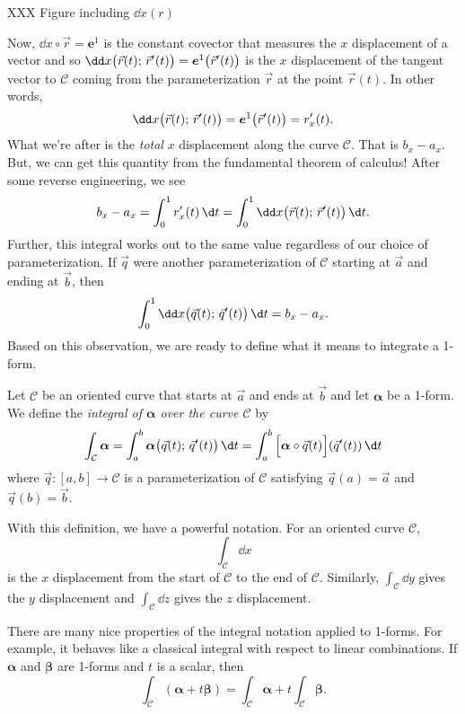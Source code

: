 XXX Figure including $\dd x(r)$

Now, $\dd x\circ \vec r = \bm e^1$ is the constant covector that measures
the $x$ displacement of a vector and so $\dd x \formarg{\vec r(t)}{\vec r'(t)}
=\bm e^1\big(\vec r'(t)\big)$
is the $x$ displacement of the tangent vector to $\mathcal C$ coming
from the parameterization $\vec r$ at the point $\vec r(t)$.   In other words,
\[
	\dd x\formarg{\vec r(t)}{\vec r'(t)}=\bm e^1\big(\vec r'(t)\big) = r_x'(t).
\]
What we're after is the \emph{total} $x$ displacement along the curve $\mathcal C$.
That is $b_x-a_x$.  But, we can get this quantity from the fundamental theorem
of calculus!  After some reverse engineering, we see
\[
	b_x-a_x = \int_0^1 r_x'(t)\, \d t 
	= \int_0^1 \dd x\formarg{\vec r(t)}{\vec r'(t)}\,\d t.
\]
Further, this integral works out to the same value regardless of our
choice of parameterization.  If $\vec q$ were another parameterization 
of $\mathcal C$ starting
at $\vec a$ and ending at $\vec b$, then 
\[
\int_0^1 \dd x\formarg{\vec q(t)}{\vec q'(t)}\,\d t=b_x-a_x.
\]
Based on this observation,
we are ready to define what it means to integrate a 1-form.

\begin{definition}
	Let $\mathcal C$ be an oriented curve that starts at $\vec a$
	and ends at $\vec b$ and let $\bm \alpha$ be a 1-form.  We define
	the \emph{integral of $\bm \alpha$ over the curve $\mathcal C$}
	by
	\[
		\int_{\mathcal C}\bm\alpha 
		=\int_a^b \bm\alpha \formarg{\vec q(t)}{\vec q'(t)}\,\d t
		= \int_a^b \Big[\bm\alpha\circ \vec q(t)\Big](\vec q'(t))\,\d t
	\]
	where $\vec q:[a,b]\to\mathcal C$ is a parameterization of
	$\mathcal C$ satisfying $\vec q(a)=\vec a$ and $\vec q(b)=\vec b$.
\end{definition}

With this definition, we have a powerful notation.  For an oriented curve $\mathcal C$,
\[
	\int_{\mathcal C} \dd x
\]
is the $x$ displacement from the start of $\mathcal C$ to the end of $\mathcal C$.
Similarly, $\int_{\mathcal C}\dd y$ gives the $y$ displacement and $\int_{\mathcal C}\dd z$
gives the $z$ displacement.

There are many nice properties of the integral notation applied to 1-forms.
For example, it behaves like a classical integral with respect to linear combinations.
If $\bm\alpha$ and $\bm\beta$ are 1-forms and $t$ is a scalar, then
\[
	\int_{\mathcal C}(\bm \alpha + t\bm\beta) = \int_{\mathcal C} \bm\alpha 
	+ t\int_{\mathcal C} \bm\beta.
\]

